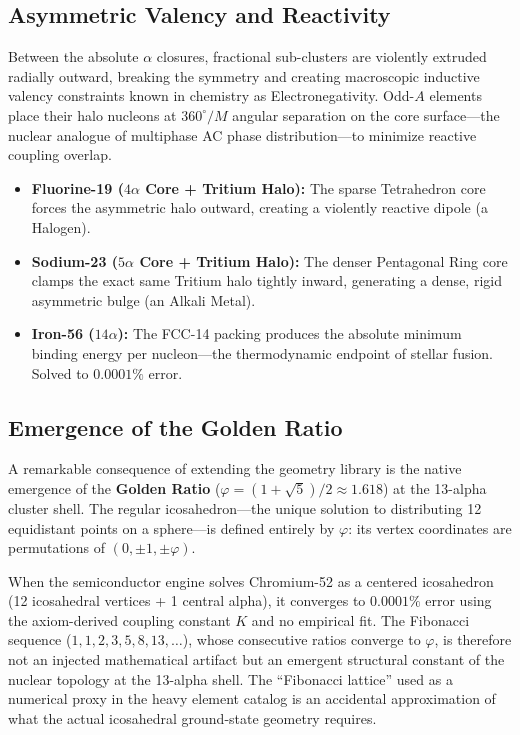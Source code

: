 \subsection{Asymmetric Valency and Reactivity}
Between the absolute $\alpha$ closures, fractional sub-clusters are violently extruded radially outward, breaking the symmetry and creating macroscopic inductive valency constraints known in chemistry as Electronegativity. Odd-$A$ elements place their halo nucleons at $360^\circ/M$ angular separation on the core surface---the nuclear analogue of multiphase AC phase distribution---to minimize reactive coupling overlap.
\begin{itemize}
    \item \textbf{Fluorine-19 ($4\alpha$ Core + Tritium Halo):} The sparse Tetrahedron core forces the asymmetric halo outward, creating a violently reactive dipole (a Halogen).
    \item \textbf{Sodium-23 ($5\alpha$ Core + Tritium Halo):} The denser Pentagonal Ring core clamps the exact same Tritium halo tightly inward, generating a dense, rigid asymmetric bulge (an Alkali Metal).
    \item \textbf{Iron-56 ($14\alpha$):} The FCC-14 packing produces the absolute minimum binding energy per nucleon---the thermodynamic endpoint of stellar fusion. Solved to $0.0001\%$ error.
\end{itemize}

\subsection{Emergence of the Golden Ratio}
A remarkable consequence of extending the geometry library is the native emergence of the \textbf{Golden Ratio} ($\varphi = (1+\sqrt{5})/2 \approx 1.618$) at the 13-alpha cluster shell. The regular icosahedron---the unique solution to distributing 12 equidistant points on a sphere---is defined entirely by $\varphi$: its vertex coordinates are permutations of $(0, \pm 1, \pm \varphi)$.

When the semiconductor engine solves Chromium-52 as a centered icosahedron (12 icosahedral vertices + 1 central alpha), it converges to $0.0001\%$ error using the axiom-derived coupling constant $K$ and no empirical fit. The Fibonacci sequence ($1, 1, 2, 3, 5, 8, 13, \ldots$), whose consecutive ratios converge to $\varphi$, is therefore not an injected mathematical artifact but an emergent structural constant of the nuclear topology at the 13-alpha shell. The ``Fibonacci lattice'' used as a numerical proxy in the heavy element catalog is an accidental approximation of what the actual icosahedral ground-state geometry requires.

